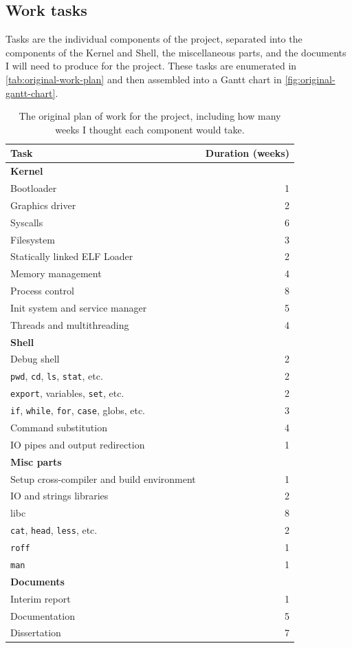 \documentclass{article}
\begin{document}
\subsection{Work tasks}
Tasks are the individual components of the project, separated into the
components of the Kernel and Shell, the miscellaneous parts, and the documents
I will need to produce for the project. These tasks are enumerated in
\autoref{tab:original-work-plan} and then assembled into a Gantt chart in
\autoref{fig:original-gantt-chart}.

\begin{table}[H]
\begin{center}
\begin{tabular}{|l|r|}
    \hline
    Task & Duration (weeks)\\
    \hline \textbf{Kernel} &\\
    Bootloader & 1\\
    Graphics driver & 2\\
    Syscalls & 6\\
    Filesystem & 3\\
    Statically linked ELF Loader & 2\\
    Memory management & 4\\
    Process control & 8\\
    Init system and service manager & 5\\
    Threads and multithreading & 4\\
    \hline \textbf{Shell} &\\
    Debug shell & 2\\
    \texttt{pwd}, \texttt{cd}, \texttt{ls}, \texttt{stat}, etc. & 2\\
    \texttt{export}, variables, \texttt{set}, etc. & 2\\
    \texttt{if}, \texttt{while}, \texttt{for}, \texttt{case}, globs, etc. & 3\\
    Command substitution & 4\\
    IO pipes and output redirection & 1\\
    \hline \textbf{Misc parts} &\\
    Setup cross-compiler and build environment & 1\\
    IO and strings libraries & 2\\
    libc & 8\\
    \texttt{cat}, \texttt{head}, \texttt{less}, etc. & 2\\
    \texttt{roff} & 1\\
    \texttt{man} & 1\\
    \hline \textbf{Documents} &\\
    Interim report & 1\\
    Documentation & 5\\
    Dissertation & 7\\
    \hline
\end{tabular}
\caption{The original plan of work for the project, including how many weeks I
thought each component would take.}
\label{tab:original-work-plan}
\end{center}
\end{table}
\end{document}
